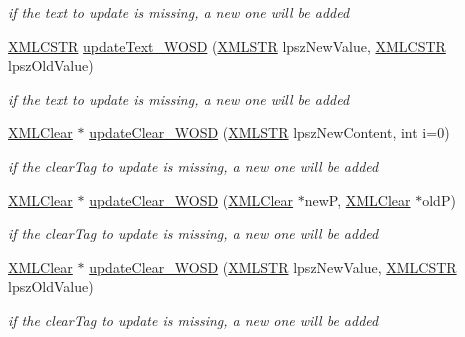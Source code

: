 \begin{DoxyCompactItemize}
\begin{DoxyCompactList}\small\item\em if the text to update is missing, a new one will be added \end{DoxyCompactList}\item 
\hyperlink{xmlParser_8h_acdb0d6fd8dd596384b438d86cfb2b182}{X\-M\-L\-C\-S\-T\-R} \hyperlink{group__xmlWOSD_gae2c448a74bf74bcd502d4ba27c63eabc}{update\-Text\-\_\-\-W\-O\-S\-D} (\hyperlink{xmlParser_8h_a849d96105aa0c8f64b5c10d9151a3cdc}{X\-M\-L\-S\-T\-R} lpsz\-New\-Value, \hyperlink{xmlParser_8h_acdb0d6fd8dd596384b438d86cfb2b182}{X\-M\-L\-C\-S\-T\-R} lpsz\-Old\-Value)
\begin{DoxyCompactList}\small\item\em if the text to update is missing, a new one will be added \end{DoxyCompactList}\item 
\hyperlink{structXMLClear}{X\-M\-L\-Clear} $\ast$ \hyperlink{group__xmlWOSD_gac977a2e6b885ff4df3895deca771c363}{update\-Clear\-\_\-\-W\-O\-S\-D} (\hyperlink{xmlParser_8h_a849d96105aa0c8f64b5c10d9151a3cdc}{X\-M\-L\-S\-T\-R} lpsz\-New\-Content, int i=0)
\begin{DoxyCompactList}\small\item\em if the clear\-Tag to update is missing, a new one will be added \end{DoxyCompactList}\item 
\hyperlink{structXMLClear}{X\-M\-L\-Clear} $\ast$ \hyperlink{group__xmlWOSD_ga4863cd3e05ad9fac028321fffe8433b9}{update\-Clear\-\_\-\-W\-O\-S\-D} (\hyperlink{structXMLClear}{X\-M\-L\-Clear} $\ast$new\-P, \hyperlink{structXMLClear}{X\-M\-L\-Clear} $\ast$old\-P)
\begin{DoxyCompactList}\small\item\em if the clear\-Tag to update is missing, a new one will be added \end{DoxyCompactList}\item 
\hyperlink{structXMLClear}{X\-M\-L\-Clear} $\ast$ \hyperlink{group__xmlWOSD_gafd4fd40229c3c4ff67f019882f213cd4}{update\-Clear\-\_\-\-W\-O\-S\-D} (\hyperlink{xmlParser_8h_a849d96105aa0c8f64b5c10d9151a3cdc}{X\-M\-L\-S\-T\-R} lpsz\-New\-Value, \hyperlink{xmlParser_8h_acdb0d6fd8dd596384b438d86cfb2b182}{X\-M\-L\-C\-S\-T\-R} lpsz\-Old\-Value)
\begin{DoxyCompactList}\small\item\em if the clear\-Tag to update is missing, a new one will be added \end{DoxyCompactList}\item 

\end{DoxyCompactItemize}
